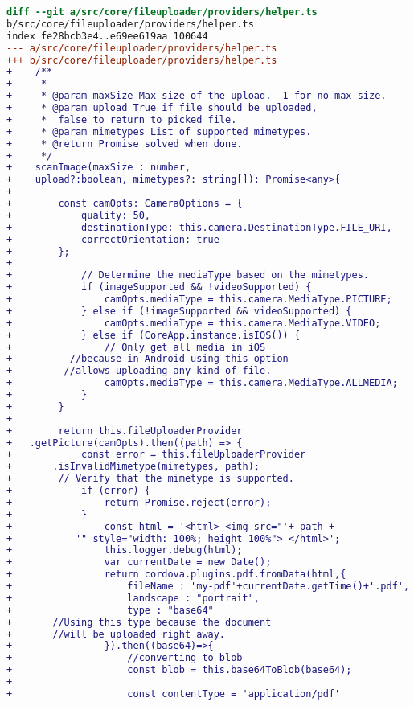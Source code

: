 \begin{lstlisting}[language=diff, frame=single, label ={fileuploader-helper}, caption = Perubahan pada \texttt{src/core/fileuploader/providers/helper.ts} ]
diff --git a/src/core/fileuploader/providers/helper.ts 
b/src/core/fileuploader/providers/helper.ts
index fe28bcb3e4..e69ee619aa 100644
--- a/src/core/fileuploader/providers/helper.ts
+++ b/src/core/fileuploader/providers/helper.ts
+    /**
+     * 
+     * @param maxSize Max size of the upload. -1 for no max size.
+     * @param upload True if file should be uploaded,
+     *  false to return to picked file.
+     * @param mimetypes List of supported mimetypes.  
+     * @return Promise solved when done.
+     */
+    scanImage(maxSize : number,
+    upload?:boolean, mimetypes?: string[]): Promise<any>{
+
+        const camOpts: CameraOptions = {
+            quality: 50,
+            destinationType: this.camera.DestinationType.FILE_URI,
+            correctOrientation: true
+        };
+
+            // Determine the mediaType based on the mimetypes.
+            if (imageSupported && !videoSupported) {
+                camOpts.mediaType = this.camera.MediaType.PICTURE;
+            } else if (!imageSupported && videoSupported) {
+                camOpts.mediaType = this.camera.MediaType.VIDEO;
+            } else if (CoreApp.instance.isIOS()) {
+                // Only get all media in iOS 
+	       //because in Android using this option 
+	      //allows uploading any kind of file.
+                camOpts.mediaType = this.camera.MediaType.ALLMEDIA;
+            }
+        }
+
+        return this.fileUploaderProvider
+	.getPicture(camOpts).then((path) => {
+            const error = this.fileUploaderProvider
+	    .isInvalidMimetype(mimetypes, path); 
+	     // Verify that the mimetype is supported.
+            if (error) {
+                return Promise.reject(error);
+            }
+                const html = '<html> <img src="'+ path +
+	        '" style="width: 100%; height 100%"> </html>';
+                this.logger.debug(html);
+                var currentDate = new Date();
+                return cordova.plugins.pdf.fromData(html,{
+                    fileName : 'my-pdf'+currentDate.getTime()+'.pdf',
+                    landscape : "portrait",
+                    type : "base64" 
+		//Using this type because the document 
+		//will be uploaded right away.
+                }).then((base64)=>{   
+                    //converting to blob
+                    const blob = this.base64ToBlob(base64);
+                    
+                    const contentType = 'application/pdf'

\end{lstlisting}
